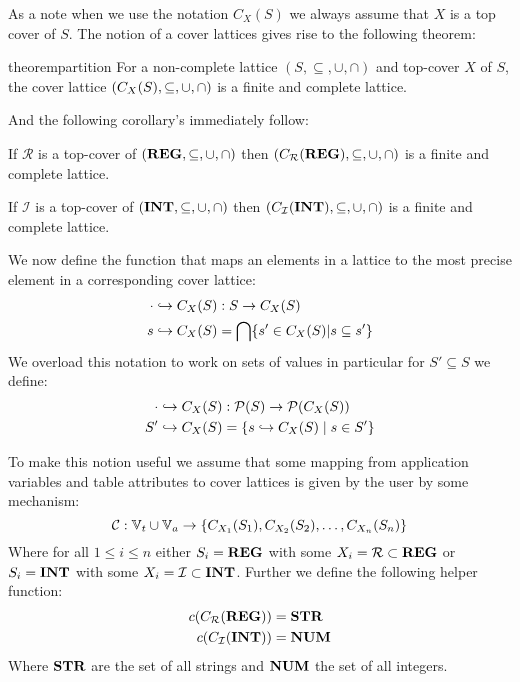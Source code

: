 As a note when we use the notation $C_X(S)$ we always assume that $X$ is a top cover of $S$.
The notion of a cover lattices gives rise to the following theorem:

\begin{restatable}{theorem}{partition}\label{thm:partition}
For a non-complete lattice $(S, \subseteq, \cup, \cap)$ and top-cover $X$ of $S$, the cover lattice $(C_{X}(S), \subseteq, \cup, \cap)$ is a finite and complete lattice.
\end{restatable}

And the following corollary's immediately follow:

\begin{corollary}
    If $\mathcal{R}$ is a top-cover of $(\mathbf{REG}, \subseteq, \cup, \cap)$ then $(C_{\mathcal{R}}(\mathbf{REG}), \subseteq, \cup, \cap)$ is a finite and complete lattice.
\end{corollary}

\begin{corollary}
    If $\mathcal{I}$ is a top-cover of $(\mathbf{INT}, \subseteq, \cup, \cap)$ then $(C_{\mathcal{I}}(\mathbf{INT}), \subseteq, \cup, \cap)$ is a finite and complete lattice.
\end{corollary}

We now define the function that maps an elements in a lattice to the most precise element in a corresponding cover lattice:
\begin{align}
    \cdot \hookrightarrow C_X(S) &: S\rightarrow C_X(S) \\
    s \hookrightarrow C_X(S) &= \bigcap\{s' \in C_X(S)|s \subseteq s'\}
\end{align}
We overload this notation to work on sets of values in particular for $S' \subseteq S$ we define:
\begin{align}
    \cdot \hookrightarrow C_X(S) &: \mathcal{P}(S) \rightarrow \mathcal{P}(C_X(S)) \\
    S' \hookrightarrow C_X (S) &= \{s \hookrightarrow C_X(S) \mid s \in S'\}
\end{align}

To make this notion useful we assume that some mapping from application variables and table attributes to cover lattices is given by the user by some mechanism:
\begin{equation}
    \mathcal{C} : \mathbb{V}_t \cup \mathbb{V}_a \rightarrow \{ C_{X_1}(S_1), C_{X_2}(S_2), \dots, C_{X_n}(S_n) \}
\end{equation}
Where for all $1 \leq i \leq n$ either $S_i = \mathbf{REG}$ with some $X_i = \mathcal{R} \subset \mathbf{REG}$ or $S_i = \mathbf{INT}$ with some $X_i = \mathcal{I} \subset \mathbf{INT}$.
Further we define the following helper function:
\begin{align}
    c(C_{\mathcal{R}}(\mathbf{REG})) &= \mathbf{STR} \\
    c(C_{\mathcal{I}}(\mathbf{INT})) &= \mathbf{NUM}
\end{align}
Where $\mathbf{STR}$ are the set of all strings and $\mathbf{NUM}$ the set of all integers.

